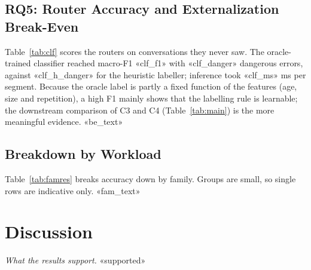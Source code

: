 \documentclass[journal]{IEEEtran}
\begin{document}
\subsection{RQ5: Router Accuracy and Externalization Break-Even}
\begin{table}[t]\centering\caption{Routers on held-out conversations («clf_rows» segment decisions from «clf_groups» conversations,
GroupKFold by conversation; ground truth = oracle labels). Dangerous: a segment needed by a current or future question sent to
EXTERNALIZE (out of «clf_needed»).}\label{tab:clf}
\end{table}
Table~\ref{tab:clf} scores the routers on conversations they never saw. The oracle-trained classifier reached macro-F1 «clf_f1» with
«clf_danger» dangerous errors, against «clf_h_danger» for the heuristic labeller; inference took «clf_ms» ms per segment. Because the
oracle label is partly a fixed function of the features (age, size and repetition), a high F1 mainly shows that the labelling rule is
learnable; the downstream comparison of C3 and C4 (Table~\ref{tab:main}) is the more meaningful evidence.
«be_text»

\subsection{Breakdown by Workload}
\begin{table}[t]\centering\caption{Accuracy by workload family (bold: above C0 on the same questions).}\label{tab:famres}
\end{table}
Table~\ref{tab:famres} breaks accuracy down by family. Groups are small, so single rows are indicative only. «fam_text»

\section{Discussion}\label{sec:discussion}
\textit{What the results support.} «supported»
\end{document}
